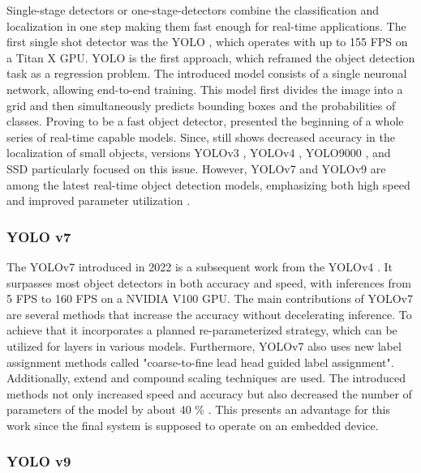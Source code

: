 Single-stage detectors or one-stage-detectors combine the classification and localization in one step making them fast enough for real-time applications.
The first single shot detector was the \ac{YOLO} \cite{YOLOv1}, which operates with up to 155 FPS on a Titan X GPU.
\ac{YOLO} is the first approach, which reframed the object detection task as a regression problem.
The introduced model consists of a single neuronal network, allowing end-to-end training.
This model first divides the image into a grid and then simultaneously predicts bounding boxes and the probabilities of classes.
Proving to be a fast object detector, \cite{YOLOv1} presented the beginning of a whole series of real-time capable models.
Since, \cite{YOLOv1} still shows decreased accuracy in the localization of small objects, versions \ac{YOLO}v3 \cite{yolov3}, \ac{YOLO}v4 \cite{yolov4}, \ac{YOLO}9000 \cite{yolo9000}, and \ac{SSD} \cite{SSD_model} particularly focused on this issue.
However, \ac{YOLO}v7 \cite{yolov7} and \ac{YOLO}v9 \cite{YOLOv9} are among the latest real-time object detection models, emphasizing both high speed and improved parameter utilization \cite{20yearsSurvey, surveyObjectDetection, surveyObjectDetection2019, realTimeObjectDetection}.

\subsubsection{YOLO v7}
\label{subsubsec:YOLOv7}

The \ac{YOLO}v7 \cite{yolov7} introduced in 2022 is a subsequent work from the \ac{YOLO}v4 \cite{yolov4}.
It surpasses most object detectors in both accuracy and speed, with inferences from 5 FPS to 160 FPS on a NVIDIA V100 GPU.
The main contributions of \ac{YOLO}v7 \cite{yolov7} are several methods that increase the accuracy without decelerating inference.
To achieve that it incorporates a planned re-parameterized strategy, which can be utilized for layers in various models.
Furthermore, \ac{YOLO}v7 \cite{yolov7} also uses new label assignment methods called "coarse-to-fine lead head guided label assignment".
Additionally, extend and compound scaling techniques are used.
The introduced methods not only increased speed and accuracy but also decreased the number of parameters of the model by about 40 \% \cite{yolov7}.
This presents an advantage for this work since the final system is supposed to operate on an embedded device.

\subsubsection{YOLO v9}
\label{subsubsec:YOLOv9}

